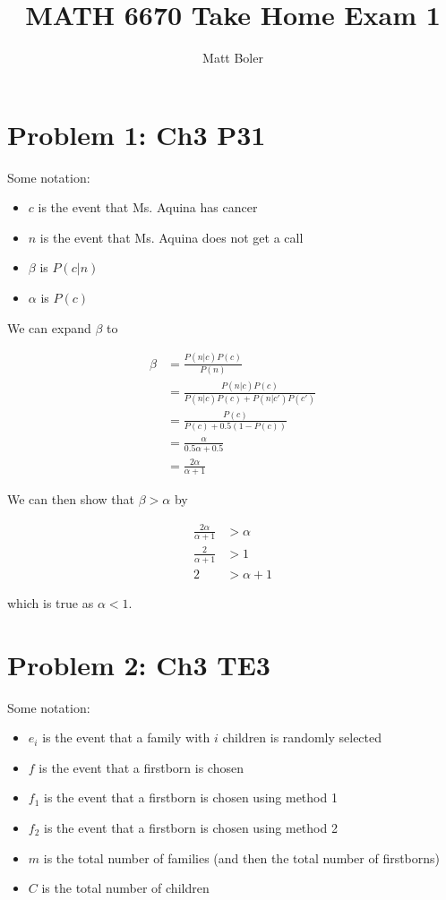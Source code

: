 \documentclass[]{article}
\title{MATH 6670 Take Home Exam 1}
\author{Matt Boler}
\begin{document}
\maketitle

\section{Problem 1: Ch3 P31}

Some notation:

\begin{itemize}
	\item $c$ is the event that Ms. Aquina has cancer
	\item $n$ is the event that Ms. Aquina does not get a call
	\item $\beta$ is $P(c | n)$
	\item $\alpha$ is $P(c)$
\end{itemize}

We can expand $\beta$ to

\begin{align*}
	\beta &= \frac{P(n|c)P(c)}{P(n)} \\
	&= \frac{P(n|c)P(c)}{P(n|c)P(c) + P(n|c')P(c')} \\
	&= \frac{P(c)}{P(c) + 0.5(1 - P(c))} \\
	&= \frac{\alpha}{0.5 \alpha + 0.5} \\
	&= \frac{2\alpha}{\alpha + 1}
\end{align*}

We can then show that $\beta > \alpha$ by

\begin{align*}
	\frac{2 \alpha}{\alpha + 1} &> \alpha \\
	\frac{2}{\alpha + 1} &> 1 \\
	2 &> \alpha + 1
\end{align*}

which is true as $\alpha < 1$.

\section{Problem 2: Ch3 TE3}

Some notation:

\begin{itemize}
	\item $e_i$ is the event that a family with $i$ children is randomly selected
	\item $f$ is the event that a firstborn is chosen
	\item $f_1$ is the event that a firstborn is chosen using method 1
	\item $f_2$ is the event that a firstborn is chosen using method 2
	\item $m$ is the total number of families (and then the total number of firstborns)
	\item $C$ is the total number of children
\end{itemize}
\end{document}
